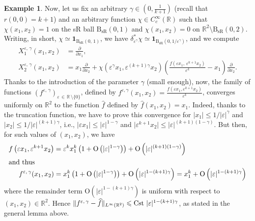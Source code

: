 \documentclass[10pt]{amsart}
\theoremstyle{definition}\newtheorem{defi}[theo]{Definition}\newtheorem{rema}[theo]{Remark}\newtheorem{exam}[theo]{Example}\newtheorem{exem}[theo]{Example}\newtheorem{nota}[theo]{Notation}
\newcommand*\R{\mathbb{R}}
\newcommand{\rmO}{\mathrm{O}}
\newcommand{\bfun}{\mathbf{1}}
\DeclareMathOperator{\Cst}{Cst}
\newcommand{\BsR}{\mathrm{B}_{\mathrm{sR}}}
\renewcommand{\leq}{\leqslant}
\let\oldhat\hat
\renewcommand*{\hat}[1]{\mathchoice{\widehat{#1}}{\widehat{#1}}{\oldhat{#1}}{\oldhat{#1}}}
\begin{document}
\begin{exem}
Now, let us fix an arbitrary $\gamma\in(0,\frac{1}{k+1})$ (recall that $r(0,0)=k+1$) and an arbitrary function $\chi\in C_c^\infty(\R)$ such that $\chi(x_1,x_2)=1$ on the sR ball $\BsR(0,1)$ and $\chi(x_1,x_2)=0$ on $\R^2\setminus\BsR(0,2)$. Writing, in short, $\chi\simeq \bfun_{\BsR(0,\,1)}$, we have $\delta_{\varepsilon^\gamma}^*\chi\simeq \bfun_{\BsR(0,1/\varepsilon^\gamma)}$, and we compute
\begin{equation*}
\begin{split}
X_1^{\varepsilon,\,\gamma}(x_1,x_2) &= \frac{\partial}{\partial x_1}, \\
X_2^{\varepsilon,\,\gamma}(x_1,x_2) &= x_1\frac{\partial}{\partial x_2} + \chi\left(\varepsilon^\gamma x_1,\varepsilon^{(k+1)\gamma} x_2\right) \left(\frac{f(\varepsilon x_1,\,\varepsilon^{k+1} x_2)}{\varepsilon^k} -x_1 \right)\frac{\partial}{\partial x_2}.
\end{split}
\end{equation*}
Thanks to the introduction of the parameter $\gamma$ (small enough), now, the family of functions $(f^{\varepsilon,\,\gamma})_{\varepsilon\,\in\,\R\,\setminus\{0\}}$, defined by $f^{\varepsilon,\gamma}(x_1,x_2)=\tfrac{f(\varepsilon x_1,\varepsilon^{k+1} x_2)}{\varepsilon^k}$, converges uniformly on $\R^2$ to the function $\widehat f$ defined by $\widehat f(x_1,x_2)=x_1$. Indeed, thanks to the truncation function, we have to prove this convergence for $\vert x_1\vert\leq 1/\vert\varepsilon\vert^\gamma$ and $\vert x_2\vert\leq 1/\vert\varepsilon\vert^{(k+1)\gamma}$, i.e., $\vert \varepsilon x_1\vert\leq \vert\varepsilon\vert^{1-\gamma}$ and $\vert \varepsilon^{k+1} x_2\vert\leq \vert\varepsilon\vert^{(k+1)(1-\gamma)}$. But then, for such values of $(x_1,x_2)$, we have
\begin{align*}
f\left(\varepsilon x_1,\varepsilon^{k+1} x_2\right)&=\varepsilon^k x_1^k\left(1+\rmO\left(\vert\varepsilon\vert^{1-\gamma}\right)\right)+\rmO\left(\vert\varepsilon\vert^{(k+1)(1-\gamma)}\right)
\\
\intertext{and thus}
f^{\varepsilon,\,\gamma}(x_1,x_2)&= x_1^k\left(1+\rmO\left(\vert\varepsilon\vert^{1-\gamma}\right)\right)+\rmO\left(\vert\varepsilon\vert^{1-(k+1)\gamma}\right) = x_1^k+\rmO\left(\vert\varepsilon\vert^{1-(k+1)\gamma}\right)
\end{align*}
where the remainder term $\rmO(\vert\varepsilon\vert^{1-(k+1)\gamma})$ is uniform with respect to $(x_1,x_2)\in\R^2$. Hence $\Vert f^{\varepsilon,\,\gamma}-\hat f\Vert_{L^\infty(\R^2)}\leq \Cst\,\vert\varepsilon\vert^{1-(k+1)\gamma}$, as stated in the general lemma above.
\end{exem}
\end{document}
